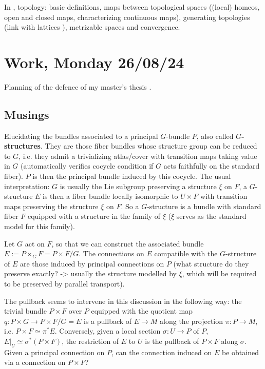 \documentclass[a4paper,12pt,parskip=half*,chapterprefix=true,numbers=noendperiod]{scrreprt}
\theoremstyle{definition}
\theoremstyle{remark}
\begin{document}
In \cite{personal:BasicsDiffGeo}, topology: basic definitions, maps between topological spaces ((local) homeos, open and closed maps, characterizing continuous maps), generating topologies (link with lattices \cite{personal:Lattices}), metrizable spaces and convergence.

\section{Work, Monday 26/08/24}

Planning of the defence of my master's thesis \cite{personalHand:MasterThesis}.

\subsection{Musings}

Elucidating the bundles associated to a principal $G$-bundle $P$, also called \textbf{$G$-structures}. They are those fiber bundles whose structure group can be reduced to $G$, i.e. they admit a trivializing atlas/cover with transition maps taking value in $G$ (automatically verifies cocycle condition if $G$ acts faithfully on the standard fiber). $P$ is then the principal bundle induced by this cocycle. The usual interpretation: $G$ is usually the Lie subgroup preserving a structure $\xi$ on $F$, a $G$-structure $E$ is then a fiber bundle locally isomorphic to $U\times F$ with transition maps preserving the structure $\xi$ on $F$. So a $G$-structure is a bundle with standard fiber $F$ equipped with a structure in the family of $\xi$ ($\xi$ serves as the standard model for this family).

Let $G$ act on $F$, so that we can construct the associated bundle $E:=P\times_GF=P\times F/G$. The connections on $E$ compatible with the $G$-structure of $E$ are those induced by principal connections on $P$ (what structure do they preserve exactly? -> usually the structure modelled by $\xi$, which will be required to be preserved by parallel transport).

The pullback seems to intervene in this discussion in the following way: the trivial bundle $P\times F$ over $P$ equipped with the quotient map $q:P\times G\to P\times F/G=E$ is a pullback of $E\to M$ along the projection $\pi:P\to M$, i.e. $P\times F\simeq \pi^*E$. Conversely, given a local section $\sigma :U\to P$ of $P$, $E|_U\simeq \sigma^*(P\times F)$, the restriction of $E$ to $U$ is the pullback of $P\times F$ along $\sigma$. Given a principal connection on $P$, can the connection induced on $E$ be obtained via a connection on $P\times F$?
\end{document}
